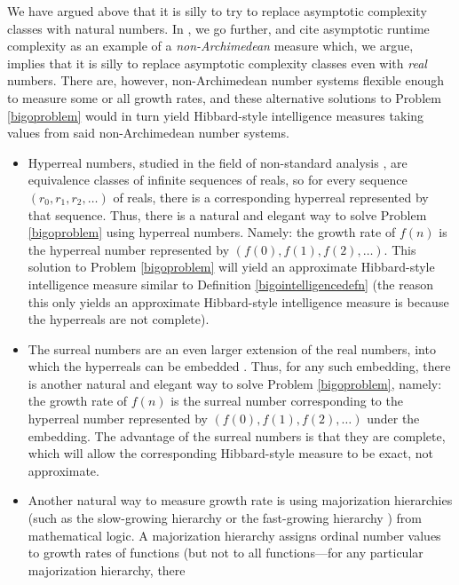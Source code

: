\documentclass{article}
\begin{document}
We have argued above that it is silly to try to replace asymptotic complexity classes
with natural numbers. In \cite{alexander2020archimedean}, we go further, and cite
asymptotic runtime complexity as an example of a \emph{non-Archimedean} measure which,
we argue, implies that it is silly to replace asymptotic complexity classes
even with \emph{real} numbers. There are, however, non-Archimedean number systems
flexible enough to measure some or all growth rates, and these alternative solutions to
Problem \ref{bigoproblem} would in turn yield Hibbard-style intelligence measures taking
values from said non-Archimedean number systems.
\begin{itemize}
    \item
    Hyperreal numbers, studied in the field of non-standard analysis \cite{robinson}
    \cite{goldblatt2012lectures},
    are equivalence classes of infinite sequences of reals,
    so for every sequence $(r_0,r_1,r_2,\ldots)$ of reals, there is a corresponding
    hyperreal represented by that sequence.
    Thus, there is a natural and elegant way to solve Problem \ref{bigoproblem}
    using hyperreal numbers. Namely: the growth rate of $f(n)$ is the hyperreal number
    represented by $(f(0),f(1),f(2),\ldots)$. This solution to Problem \ref{bigoproblem}
    will yield an approximate Hibbard-style intelligence measure similar to
    Definition \ref{bigointelligencedefn} (the reason this only yields an approximate
    Hibbard-style intelligence measure is because the hyperreals are not complete).
    \item
    The surreal numbers \cite{conway} \cite{knuth} are an even larger extension
    of the real numbers, into which the hyperreals can be embedded
    \cite{ehrlich2012absolute}.
    Thus, for any such embedding,
    there is another natural and elegant way to solve Problem \ref{bigoproblem},
    namely: the growth rate of $f(n)$ is the surreal number corresponding to the
    hyperreal number represented by $(f(0),f(1),f(2),\ldots)$ under the embedding.
    The advantage of the surreal numbers is that they are complete, which will allow
    the corresponding Hibbard-style measure to be exact, not approximate.
    \item
    Another natural way to measure growth rate is using majorization hierarchies
    (such as the slow-growing hierarchy or the fast-growing hierarchy
    \cite{weiermann2002slow}) from mathematical
    logic. A majorization hierarchy assigns ordinal number values to growth rates of
    functions (but not to all functions---for any particular majorization hierarchy, there

\end{itemize}
\end{document}
